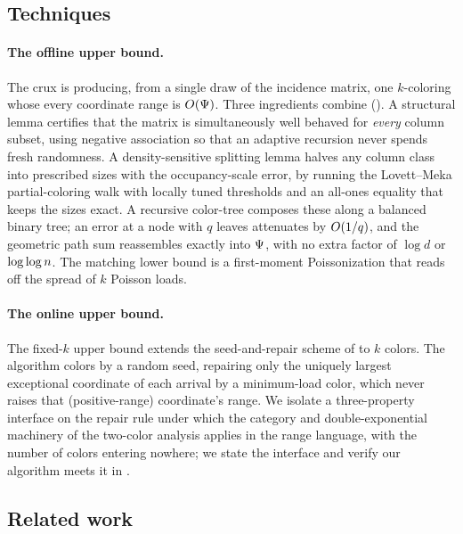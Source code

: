 \subsection{Techniques}\label{sec:intro-techniques}

\paragraph{The offline upper bound.}
The crux is producing, from a single draw of the incidence matrix, one $k$-coloring whose every coordinate
range is $O(\Psi)$. Three ingredients combine (). A structural lemma certifies that the matrix is
simultaneously well behaved for \emph{every} column subset, using negative association so that an adaptive recursion never
spends fresh randomness. A density-sensitive splitting lemma halves any column class into prescribed sizes with the
occupancy-scale error, by running the Lovett--Meka partial-coloring walk with locally tuned thresholds and an all-ones
equality that keeps the sizes exact. A recursive color-tree composes these along a balanced binary tree; an error at a node
with $q$ leaves attenuates by $O(1/q)$, and the geometric path sum reassembles exactly into $\Psi$, with no extra factor
of $\log d$ or $\log\log n$. The matching lower bound is a first-moment Poissonization that reads off the spread of $k$
Poisson loads.

\paragraph{The online upper bound.}
The fixed-$k$ upper bound extends the seed-and-repair scheme of \cite{AT2025} to $k$ colors. The algorithm colors by a random
seed, repairing only the uniquely largest exceptional coordinate of each arrival by a minimum-load color, which never raises
that (positive-range) coordinate's range. We isolate a three-property interface on the repair rule under which the category
and double-exponential machinery of the two-color analysis applies in the range language, with the number of colors entering
nowhere; we state the interface and verify our algorithm meets it in .

\subsection{Related work}\label{sec:intro-related}

